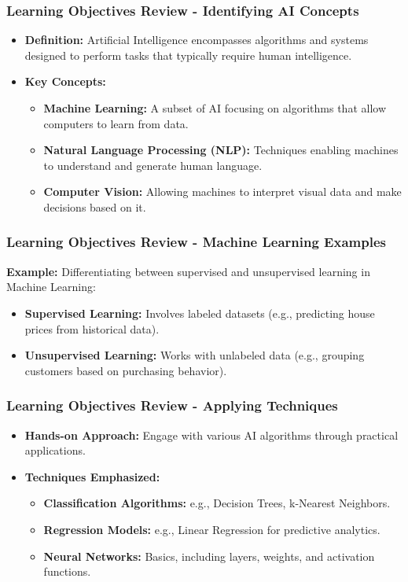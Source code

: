 \documentclass[aspectratio=169]{beamer}
\begin{document}
\begin{frame}[fragile]
    \frametitle{Learning Objectives Review - Identifying AI Concepts}
    \begin{itemize}
        \item \textbf{Definition:} Artificial Intelligence encompasses algorithms and systems designed to perform tasks that typically require human intelligence.
        \item \textbf{Key Concepts:}
        \begin{itemize}
            \item \textbf{Machine Learning:} A subset of AI focusing on algorithms that allow computers to learn from data.
            \item \textbf{Natural Language Processing (NLP):} Techniques enabling machines to understand and generate human language.
            \item \textbf{Computer Vision:} Allowing machines to interpret visual data and make decisions based on it.
        \end{itemize}
    \end{itemize}
\end{frame}

\begin{frame}[fragile]
    \frametitle{Learning Objectives Review - Machine Learning Examples}
    \textbf{Example:} Differentiating between supervised and unsupervised learning in Machine Learning:
    \begin{itemize}
        \item \textbf{Supervised Learning:} Involves labeled datasets (e.g., predicting house prices from historical data).
        \item \textbf{Unsupervised Learning:} Works with unlabeled data (e.g., grouping customers based on purchasing behavior).
    \end{itemize}
\end{frame}

\begin{frame}[fragile]
    \frametitle{Learning Objectives Review - Applying Techniques}
    \begin{itemize}
        \item \textbf{Hands-on Approach:} Engage with various AI algorithms through practical applications.
        \item \textbf{Techniques Emphasized:}
        \begin{itemize}
            \item \textbf{Classification Algorithms:} e.g., Decision Trees, k-Nearest Neighbors.
            \item \textbf{Regression Models:} e.g., Linear Regression for predictive analytics.
            \item \textbf{Neural Networks:} Basics, including layers, weights, and activation functions.
        \end{itemize}
    \end{itemize}
\end{frame}
\end{document}

